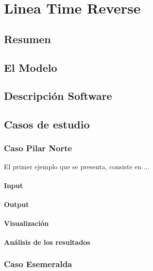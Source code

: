 
\chapter{Linea Time Reverse}

\section{Resumen}

\section{El Modelo}

\section{Descripci\'on Software}


\section{Casos de estudio}

\subsection{Caso Pilar Norte}


El primer ejemplo que se presenta, consiste en ...


\subsubsection{Input}

\subsubsection{Output}

\subsubsection{Visualizaci\'on}

\subsubsection{An\'alisis de los resultados}

\subsection{Caso Esemeralda}


